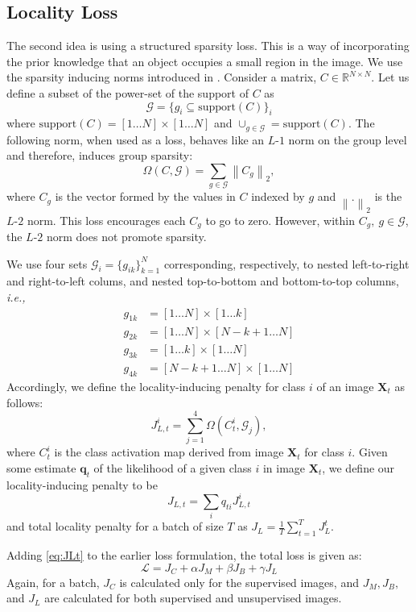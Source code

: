 \subsection{Locality Loss}
The second idea is using a structured sparsity loss. This is a way of incorporating the prior knowledge
that an object occupies a small region in the image. We use the sparsity inducing norms introduced in
\cite{groupsparsity,sparsepca}. Consider a matrix, $C \in \mathbb{R}^{N \times
N}$. Let us define a subset of the power-set of the support of $C$ as
\begin{equation}
	\mathcal{G} = \{g_i \subseteq \textrm{support}(C)\}_i
\end{equation}
where $\textrm{support}(C) = [1 \dots N] \times [1 \dots N]$ and $\cup_{g \in \mathcal{G}} = \textrm{support}(C)$. The following norm, when used as a
loss, behaves like an $L$-$1$ norm on the group level and therefore, induces group sparsity:
\begin{equation}
	\Omega (C, \mathcal{G}) = \sum_{g \in \mathcal{G}} \left\lVert C_g \right\rVert _2,
\end{equation}
where $C_g$ is the vector formed by the values in $C$ indexed by $g$ and $\left\lVert . \right\rVert_2$ is
the $L$-$2$ norm. This loss encourages each $C_g$ to go to zero. However, within $C_g,~g
\in \mathcal{G}$, the $L$-$2$ norm does not promote sparsity.

We use four sets $\mathcal G_i = \{g_{ik}\}_{k=1}^N$ corresponding, respectively, to nested
left-to-right and right-to-left colums, and nested top-to-bottom and bottom-to-top columns,
\textit{i.e.,}
\begin{align}
  g_{1k} & = [1 \ldots N] \times [1 \ldots k] \\
  g_{2k} & = [1 \ldots N] \times [N-k+1 \ldots N] \\
  g_{3k} & = [1 \ldots k] \times [1 \ldots N] \\
  g_{4k} & = [N-k+1 \ldots N] \times [1 \ldots N]
\end{align}
Accordingly, we define the locality-inducing penalty for class $i$ of an image $\mathbf{X}_t$ as follows:
\begin{equation} \label{eq:JLt}
	J_{L,t}^{i} = \sum_{j=1}^{4}\Omega(C^i_t, \mathcal G_j),
\end{equation}
where $C^i_{t}$ is the class activation map \cite{CAM} derived from image $\mathbf X_t$ for class
$i$. Given some estimate $\mathbf q_{t}$ of the likelihood of a given class $i$ in image $\mathbf
X_t$, we define our locality-inducing penalty to be
\begin{equation}
  J_{L,t} = \sum_{i} q_{ti} J_{L,t}^i
\end{equation}
and total locality penalty for a batch of size $T$ as $J_L =  \frac{1}{T} \sum_{t=1}^T J_L^t$. 

Adding \eqref{eq:JLt} to the earlier loss formulation, the total loss is given as:
\begin{equation}
	\mathcal{L} = J_C + \alpha J_M + \beta J_B + \gamma J_L
\end{equation}
Again, for a batch, $J_C$ is calculated only for the supervised images, and $J_M, J_B, $ and $J_L$
are calculated for both supervised and unsupervised images.
